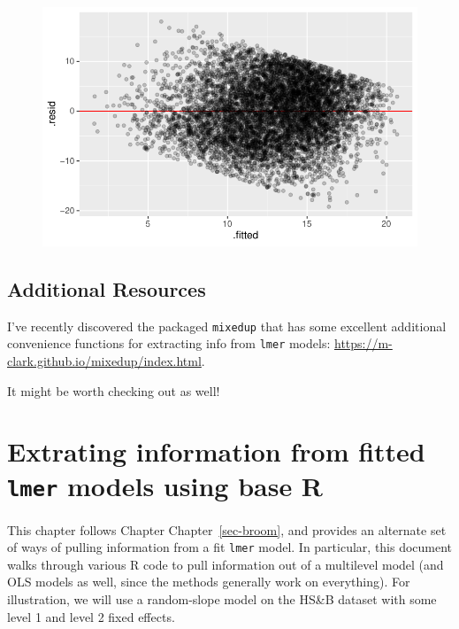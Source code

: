 \documentclass[
  letterpaper,
  DIV=11,
  numbers=noendperiod]{scrreprt}
\begin{document}
\begin{figure}[H]

{\centering \includegraphics{broom_files/figure-pdf/unnamed-chunk-12-2.pdf}

}

\end{figure}

\hypertarget{additional-resources}{%
\section{Additional Resources}\label{additional-resources}}

I've recently discovered the packaged \texttt{mixedup} that has some
excellent additional convenience functions for extracting info from
\texttt{lmer} models:
\url{https://m-clark.github.io/mixedup/index.html}.

It might be worth checking out as well!

\hypertarget{extrating-information-from-fitted-lmer-models-using-base-r}{%
\chapter{\texorpdfstring{Extrating information from fitted \texttt{lmer}
models using base
R}{Extrating information from fitted lmer models using base R}}\label{extrating-information-from-fitted-lmer-models-using-base-r}}

This chapter follows Chapter Chapter~\ref{sec-broom}, and provides an
alternate set of ways of pulling information from a fit \texttt{lmer}
model. In particular, this document walks through various R code to pull
information out of a multilevel model (and OLS models as well, since the
methods generally work on everything). For illustration, we will use a
random-slope model on the HS\&B dataset with some level 1 and level 2
fixed effects.
\end{document}
